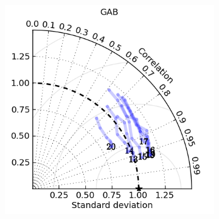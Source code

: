 \begin{figure}[H]
\begin{subfigure}{0.30\textwidth}
        \caption{}
    \end{subfigure}
    \begin{subfigure}{0.30\textwidth}
        \includegraphics[width=\textwidth]{figures/plots/taylor_diag_res_GAB.png}
        \caption{}
    \end{subfigure}
    \begin{subfigure}{0.30\textwidth}


\end{subfigure}
\end{figure}
